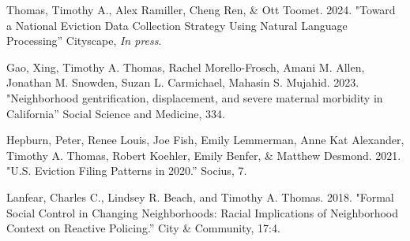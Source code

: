 



\begin{cvparagraph}

Thomas, Timothy A., Alex Ramiller, Cheng Ren, \& Ott Toomet. 2024. "Toward a National Eviction Data Collection Strategy Using Natural Language Processing” Cityscape, \textit{In press}.
\end{cvparagraph}

\begin{cvparagraph}

Gao, Xing, Timothy A. Thomas, Rachel Morello-Frosch, Amani M. Allen, Jonathan M. Snowden, Suzan L. Carmichael, Mahasin S. Mujahid.  
2023. "Neighborhood gentrification, displacement, and severe maternal morbidity in California” Social Science and Medicine, 334.
\end{cvparagraph}

\begin{cvparagraph}

Hepburn, Peter, Renee Louis, Joe Fish, Emily Lemmerman, Anne Kat Alexander,  Timothy A. Thomas, Robert Koehler, Emily Benfer, \& Matthew Desmond. 2021. "U.S. Eviction Filing Patterns in 2020.” Socius, 7.
\end{cvparagraph}

\begin{cvparagraph}

Lanfear, Charles C., Lindsey R. Beach, and Timothy A. Thomas. 2018. "Formal Social Control in Changing Neighborhoods: Racial Implications of Neighborhood Context on Reactive Policing.” City \& Community, 17:4.
\end{cvparagraph}

